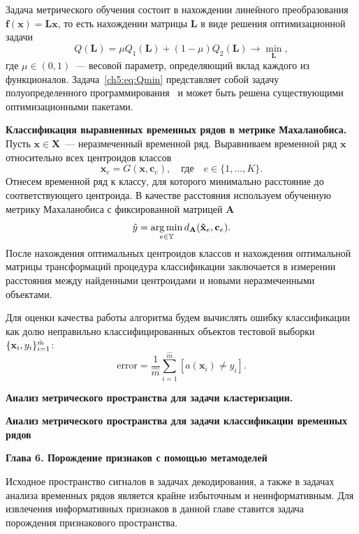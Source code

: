 \documentclass[11pt, a5paper]{dissert}
\begin{document}
Задача метрического обучения состоит в нахождении линейного преобразования $\mathbf{f}(\mathbf{x}) = \mathbf{Lx}$, то есть нахождении матрицы $\mathbf{L}$ в виде решения оптимизационной задачи
\begin{equation}
	\label{ch5:eq:Qmin}
	Q(\mathbf{L}) = \mu Q_1(\mathbf{L}) + (1 - \mu) Q_2(\mathbf{L}) \rightarrow \min_{\mathbf{L}},
\end{equation}
где $\mu \in (0, 1)$~--- весовой параметр, определяющий вклад каждого из функционалов.
Задача~\eqref{ch5:eq:Qmin} представляет собой задачу полуопределенного программирования~\cite{vandenberghe1996semidefinite} и может быть решена существующими оптимизационными пакетами.

\textbf{Классификация выравненных временных рядов в метрике Махаланобиса.}
Пусть $\mathbf{x} \in \mathbf{X}$~--- неразмеченный временной ряд. Выравниваем временной ряд $\mathbf{x}$ относительно всех центроидов классов
\[
	\mathbf{\hat{x}}_e = G(\mathbf{x}, \mathbf{c}_e), \quad \text{где} \quad e \in \{1, \dots, K\}.
\]
Отнесем временной ряд к классу, для которого минимально расстояние до соответствующего центроида. В качестве расстояния используем обученную метрику Махаланобиса с фиксированной матрицей $\mathbf{A}$
\[
	\hat{y} = \mathop{\arg \min}\limits_{e \in \mathbb{Y}} d_\mathbf{A}(\mathbf{\hat{x}}_e, \mathbf{c}_e).
\]
После нахождения оптимальных центроидов классов и нахождения оптимальной матрицы трансформаций процедура классификации заключается в измерении расстояния между найденными центроидами и новыми неразмеченными объектами.

Для оценки качества работы алгоритма будем вычислять ошибку классификации как долю неправильно классифицированных объектов тестовой выборки~$\{ \mathbf{x}_i, y_i \}_{i=1}^{\hat{m}}$:
\[
	\text{error} = \frac1{\hat{m}} \sum_{i = 1} ^ {\hat{m}} [a(\mathbf{x}_i) \ne y_i].
\]

\textbf{Анализ метрического пространства для задачи кластеризации.}
\label{sec:ch5:exp_clustering}

\textbf{Анализ метрического пространства для задачи классификации временных рядов}
\label{sec:ch5:exp_classification}

\textbf{Глава 6. Порождение признаков с помощью метамоделей}
\label{ch:metamodels}

Исходное пространство сигналов в задачах декодирования, а также в задачах анализа временных рядов является крайне избыточным и неинформативным.
Для извлечения информативных признаков в данной главе ставится задача порождения признакового пространства.
\end{document}
